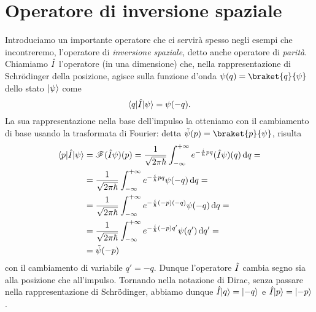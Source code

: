 \section{Operatore di inversione spaziale}
Introduciamo un importante operatore che ci servirà spesso negli esempi che incontreremo, l'operatore di \emph{inversione spaziale}, detto anche operatore di \emph{parità}.
Chiamiamo $\hat{I}$ l'operatore (in una dimensione) che, nella rappresentazione di Schr\"odinger della posizione, agisce sulla funzione d'onda $\psi(q)=\braket{q}{\psi}$ dello stato $\lvert\psi\rangle$ come
\begin{equation}
	\langle q\rvert\hat{I}\lvert\psi\rangle=\psi(-q).
	\label{eq:inversione-spaziale-posizione}
\end{equation}
La sua rappresentazione nella base dell'impulso la otteniamo con il cambiamento di base usando la trasformata di Fourier: detta $\tilde{\psi}(p)=\braket{p}{\psi}$, risulta
\begin{equation}
	\begin{split}
		\langle p\rvert\hat{I}\lvert\psi\rangle&=\operatorname{\mathscr{F}}(\hat{I}\psi)(p)=\frac1{\sqrt{2\pi\hbar}}\int_{-\infty}^{+\infty}e^{-\frac{i}{\hbar}pq}(\hat{I}\psi)(q)\,\textup{d} q=\\
		&=\frac1{\sqrt{2\pi\hbar}}\int_{-\infty}^{+\infty}e^{-\frac{i}{\hbar}pq}\psi(-q)\,\textup{d} q=\\
		&=\frac1{\sqrt{2\pi\hbar}}\int_{-\infty}^{+\infty}e^{-\frac{i}{\hbar}(-p)(-q)}\psi(-q)\,\textup{d} q=\\
		&=\frac1{\sqrt{2\pi\hbar}}\int_{-\infty}^{+\infty}e^{-\frac{i}{\hbar}(-p)q'}\psi(q')\,\textup{d} q'=\\
		&=\tilde{\psi}(-p)
	\end{split}
	\label{eq:inversione-spaziale-impulso}
\end{equation}
con il cambiamento di variabile $q'=-q$.
Dunque l'operatore $\hat{I}$ cambia segno sia alla posizione che all'impulso.
Tornando nella notazione di Dirac, senza passare nella rappresentazione di Schr\"odinger, abbiamo dunque $\hat{I}\lvert q\rangle=\lvert-q\rangle$ e $\hat{I}\lvert p\rangle=\lvert-p\rangle$.

